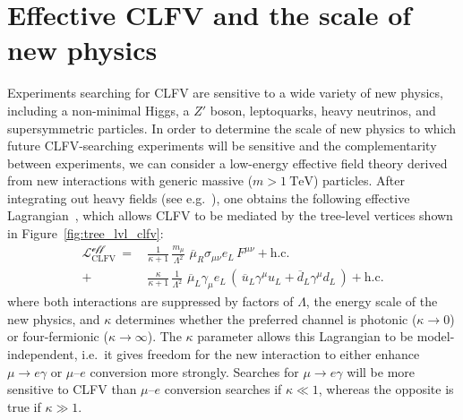 \section{Effective CLFV and the scale of new physics}
Experiments searching for CLFV are sensitive to a wide variety of new physics,
including a non-minimal Higgs, a $Z'$ boson, leptoquarks, heavy neutrinos, and
supersymmetric particles. 
In order to determine the scale of new physics to which future CLFV-searching
experiments will be sensitive and the complementarity between experiments, we can
consider a low-energy effective field theory derived from new interactions with
generic massive ($m>\SI{1}{\tera\eV}$) particles.
After integrating out heavy fields (see
e.g.~\cite[Chapter~IV]{donoghue_golowich_holstein_2014}), one obtains the
following effective Lagrangian~\cite{DEGOUVEA201375}, which allows CLFV to be
mediated by the tree-level vertices shown in Figure~\ref{fig:tree_lvl_clfv}:
\begin{align}\label{eq:Leff}
    \mathcal{L^\text{eff}_\mathrm{CLFV}}\,
    =\,
    &\frac{1}{\kappa+1}\, \frac{m_\mu}{\Lambda^2}\,\,
    \overline{\mu}_R \sigma_{\mu\nu} e_L \, F^{\mu\nu} + \text{h.c.}
    \nonumber\\[1em]
    +\,
    &\frac{\kappa}{\kappa+1}\, \frac{1}{\Lambda^2}\,\,
    \overline{\mu}_L \gamma_\mu e_L \,
    (\,
        \overline{u}_L \gamma^\mu u_L + \overline{d}_L \gamma^\mu d_L
    \,) + \text{h.c.}
\end{align}
where both interactions are suppressed by factors of $\Lambda$, the energy scale
of the new physics, and $\kappa$ determines whether the preferred channel is
photonic ($\kappa \rightarrow 0$) or four-fermionic ($\kappa \rightarrow
\infty$). The $\kappa$ parameter allows this Lagrangian to
be model-independent, i.e.\ it gives freedom for the new interaction to either
enhance $\mu \rightarrow e\gamma$ or $\mu$--$e$ conversion more strongly.
Searches for $\mu \rightarrow e\gamma$ will be more sensitive to CLFV than
$\mu$--$e$ conversion searches if $\kappa \ll 1$, whereas the opposite is true
if $\kappa \gg 1$.

